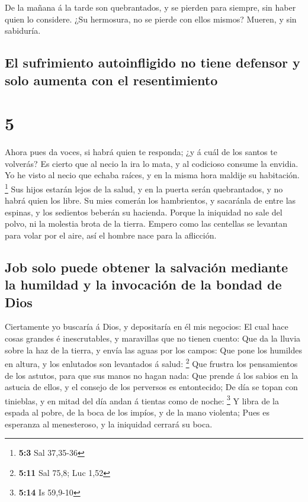  De la mañana á la tarde son quebrantados, y se pierden
para siempre, sin haber quien lo considere.  ¿Su hermosura,
no se pierde con ellos mismos? Mueren, y sin sabiduría.

\hypertarget{el-sufrimiento-autoinfligido-no-tiene-defensor-y-solo-aumenta-con-el-resentimiento}{%
\subsection{El sufrimiento autoinfligido no tiene defensor y solo
aumenta con el
resentimiento}\label{el-sufrimiento-autoinfligido-no-tiene-defensor-y-solo-aumenta-con-el-resentimiento}}

\hypertarget{section-4}{%
\section{5}\label{section-4}}

 Ahora pues da voces, si habrá quien te responda; ¿y á cuál
de los santos te volverás?  Es cierto que al necio la ira lo
mata, y al codicioso consume la envidia.  Yo he visto al
necio que echaba raíces, y en la misma hora maldije su habitación.
\footnote{\textbf{5:3} Sal 37,35-36}  Sus hijos estarán
lejos de la salud, y en la puerta serán quebrantados, y no habrá quien
los libre.  Su mies comerán los hambrientos, y sacaránla de
entre las espinas, y los sedientos beberán su hacienda. 
Porque la iniquidad no sale del polvo, ni la molestia brota de la
tierra.  Empero como las centellas se levantan para volar
por el aire, así el hombre nace para la aflicción.

\hypertarget{job-solo-puede-obtener-la-salvaciuxf3n-mediante-la-humildad-y-la-invocaciuxf3n-de-la-bondad-de-dios}{%
\subsection{Job solo puede obtener la salvación mediante la humildad y
la invocación de la bondad de
Dios}\label{job-solo-puede-obtener-la-salvaciuxf3n-mediante-la-humildad-y-la-invocaciuxf3n-de-la-bondad-de-dios}}

 Ciertamente yo buscaría á Dios, y depositaría en él mis
negocios:  El cual hace cosas grandes é inescrutables, y
maravillas que no tienen cuento:  Que da la lluvia sobre la
haz de la tierra, y envía las aguas por los campos:  Que
pone los humildes en altura, y los enlutados son levantados á salud:
\footnote{\textbf{5:11} Sal 75,8; Luc 1,52}  Que frustra
los pensamientos de los astutos, para que sus manos no hagan nada:
 Que prende á los sabios en la astucia de ellos, y el
consejo de los perversos es entontecido;  De día se topan
con tinieblas, y en mitad del día andan á tientas como de noche:
\footnote{\textbf{5:14} Is 59,9-10}  Y libra de la espada
al pobre, de la boca de los impíos, y de la mano violenta; 
Pues es esperanza al menesteroso, y la iniquidad cerrará su boca.

